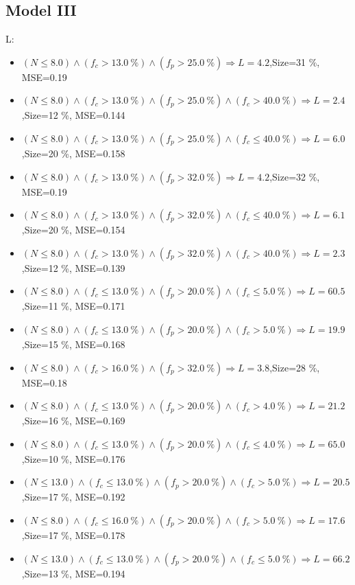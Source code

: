 \documentclass[numbered]{CSL}
\begin{document}
\subsection{Model III}
L:
\begin{itemize}
\item $(N \leq 8.0) \land (f_c > 13.0~\%) \land (f_p > 25.0~\%) \Rightarrow L = 4.2$,\hfill Size=31 \%, MSE=0.19
\item $(N \leq 8.0) \land (f_c > 13.0~\%) \land (f_p > 25.0~\%) \land (f_c > 40.0~\%) \Rightarrow L = 2.4$,\hfill Size=12 \%, MSE=0.144
\item $(N \leq 8.0) \land (f_c > 13.0~\%) \land (f_p > 25.0~\%) \land (f_c \leq 40.0~\%) \Rightarrow L = 6.0$,\hfill Size=20 \%, MSE=0.158
\item $(N \leq 8.0) \land (f_c > 13.0~\%) \land (f_p > 32.0~\%) \Rightarrow L = 4.2$,\hfill Size=32 \%, MSE=0.19
\item $(N \leq 8.0) \land (f_c > 13.0~\%) \land (f_p > 32.0~\%) \land (f_c \leq 40.0~\%) \Rightarrow L = 6.1$,\hfill Size=20 \%, MSE=0.154
\item $(N \leq 8.0) \land (f_c > 13.0~\%) \land (f_p > 32.0~\%) \land (f_c > 40.0~\%) \Rightarrow L = 2.3$,\hfill Size=12 \%, MSE=0.139
\item $(N \leq 8.0) \land (f_c \leq 13.0~\%) \land (f_p > 20.0~\%) \land (f_c \leq 5.0~\%) \Rightarrow L = 60.5$,\hfill Size=11 \%, MSE=0.171
\item $(N \leq 8.0) \land (f_c \leq 13.0~\%) \land (f_p > 20.0~\%) \land (f_c > 5.0~\%) \Rightarrow L = 19.9$,\hfill Size=15 \%, MSE=0.168
\item $(N \leq 8.0) \land (f_c > 16.0~\%) \land (f_p > 32.0~\%) \Rightarrow L = 3.8$,\hfill Size=28 \%, MSE=0.18
\item $(N \leq 8.0) \land (f_c \leq 13.0~\%) \land (f_p > 20.0~\%) \land (f_c > 4.0~\%) \Rightarrow L = 21.2$,\hfill Size=16 \%, MSE=0.169
\item $(N \leq 8.0) \land (f_c \leq 13.0~\%) \land (f_p > 20.0~\%) \land (f_c \leq 4.0~\%) \Rightarrow L = 65.0$,\hfill Size=10 \%, MSE=0.176
\item $(N \leq 13.0) \land (f_c \leq 13.0~\%) \land (f_p > 20.0~\%) \land (f_c > 5.0~\%) \Rightarrow L = 20.5$,\hfill Size=17 \%, MSE=0.192
\item $(N \leq 8.0) \land (f_c \leq 16.0~\%) \land (f_p > 20.0~\%) \land (f_c > 5.0~\%) \Rightarrow L = 17.6$,\hfill Size=17 \%, MSE=0.178
\item $(N \leq 13.0) \land (f_c \leq 13.0~\%) \land (f_p > 20.0~\%) \land (f_c \leq 5.0~\%) \Rightarrow L = 66.2$,\hfill Size=13 \%, MSE=0.194

\end{itemize}
\end{document}
